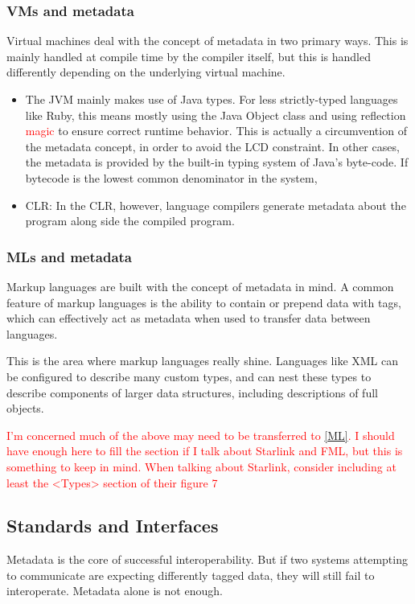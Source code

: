 \documentclass{sig-alternate}
\newcommand{\mycomment}[1]{\textcolor{red}{#1}}
\begin{document}
\subsubsection*{VMs and metadata}
Virtual machines deal with the concept of metadata in two primary ways. This is mainly handled at compile time by the compiler itself, but this is handled differently depending on the underlying virtual machine.
\begin{itemize}
\item The JVM mainly makes use of Java types. For less strictly-typed languages like Ruby, this means mostly using the Java Object class and using reflection \mycomment{magic} to ensure correct runtime behavior. This is actually a circumvention of the metadata concept, in order to avoid the LCD constraint. In other cases, the metadata is provided by the built-in typing system of Java's byte-code. If bytecode is the lowest common denominator in the system, 
\item CLR: In the CLR, however, language compilers generate metadata about the program along side the compiled program\cite{Hamilton:2003}.
\end{itemize}

\subsubsection*{MLs and metadata}
Markup languages are built with the concept of metadata in mind. A common feature of markup languages is the ability to contain or prepend data with tags, which can effectively act as metadata when used to transfer data between languages.

This is the area where markup languages really shine. Languages like XML can be configured to describe many custom types, and can nest these types to describe components of larger data structures, including descriptions of full objects.

\mycomment{I'm concerned much of the above may need to be transferred to \ref{ML}. I should have enough here to fill the section if I talk about Starlink and FML, but this is something to keep in mind.}
\mycomment{When talking about Starlink, consider including at least the <Types> section of their figure 7}

\subsection{Standards and Interfaces}\label{standards}
Metadata is the core of successful interoperability. But if two systems attempting to communicate are expecting differently tagged data, they will still fail to interoperate. Metadata alone is not enough.
\end{document}
